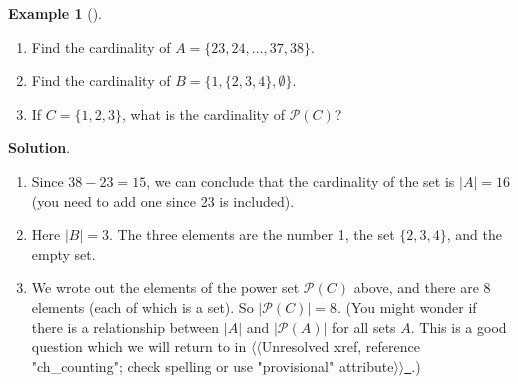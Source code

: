 \documentclass[10pt,]{book}
\theoremstyle{plain}
\theoremstyle{definition}
\theoremstyle{definition}
\newtheorem{example}[theorem]{Example}
\theoremstyle{definition}
\theoremstyle{definition}
\numberwithin{equation}{chapter}
\def\pow{\mathcal P}
\newcommand{\card}[1]{\left| #1 \right|}
\begin{document}
\begin{example}[]\label{example-42}
\hypertarget{p-1609}{}%
\leavevmode%
\begin{enumerate}
\item\hypertarget{li-458}{}\hypertarget{p-1610}{}%
Find the cardinality of \(A = \{23, 24, \ldots, 37, 38\}\).%
\item\hypertarget{li-459}{}\hypertarget{p-1611}{}%
Find the cardinality of \(B = \{1, \{2, 3, 4\}, \emptyset\}\).%
\item\hypertarget{li-460}{}\hypertarget{p-1612}{}%
If \(C = \{1,2,3\}\), what is the cardinality of \(\pow(C)\)?%
\end{enumerate}
%
\par\smallskip%
\noindent\textbf{Solution}.\hypertarget{solution-133}{}\quad%
\hypertarget{p-1613}{}%
\leavevmode%
\begin{enumerate}
\item\hypertarget{li-461}{}\hypertarget{p-1614}{}%
Since \(38 - 23 = 15\), we can conclude that the cardinality of the set is \(|A| = 16\) (you need to add one since 23 is included).%
\item\hypertarget{li-462}{}\hypertarget{p-1615}{}%
Here \(|B| = 3\). The three elements are the number 1, the set \(\{2,3,4\}\), and the empty set.%
\item\hypertarget{li-463}{}\hypertarget{p-1616}{}%
We wrote out the elements of the power set \(\pow(C)\) above, and there are 8 elements (each of which is a set). So \(\card{\pow(C)} = 8\).  (You might wonder if there is a relationship between \(\card{A}\) and \(\card{\pow(A)}\) for all sets \(A\).  This is a good question which we will return to in {$\langle\langle$Unresolved xref, reference "ch\_counting"; check spelling or use "provisional" attribute$\rangle\rangle$}\hyperlink{}{~}.)%
\end{enumerate}
%
\end{example}
\typeout{************************************************}
\typeout{************************************************}
\end{document}
